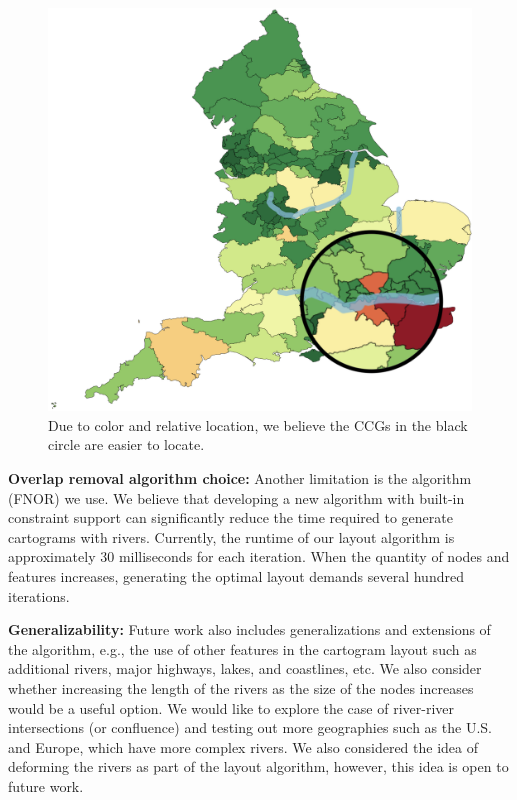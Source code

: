 \documentclass[Afour,sagev,times]{sagej}
\begin{document}
    {
        \begin{figure}[tb!]
            \centering
            \includegraphics[width=0.8\columnwidth,keepaspectratio]{extreme.png}
            \caption{Due to color and relative location, we believe the CCGs in the black circle are easier to locate.}
            \label{fig:extreme}
        \end{figure}
    }

\noindent\textbf{Overlap removal algorithm choice:} Another limitation is the algorithm (FNOR) we use.
We believe that developing a new algorithm with built-in constraint support can significantly reduce the time required to generate cartograms with rivers.
Currently, the runtime of our layout algorithm is approximately 30 milliseconds for each iteration. When the quantity of nodes and features increases, generating the optimal layout demands several hundred iterations.

\noindent\textbf{Generalizability:} Future work also includes generalizations and extensions of the algorithm, e.g., the use of other features in the cartogram layout such as additional rivers, major highways, lakes, and coastlines, etc.
We also consider whether increasing the length of the rivers as the size of the nodes increases would be a useful option.
We would like to explore the case of river-river intersections (or confluence) and testing out more geographies such as the U.S.
and Europe, which have more complex rivers.
We also considered the idea of deforming the rivers as part of the layout algorithm, however, this idea is open to future work.
\end{document}
